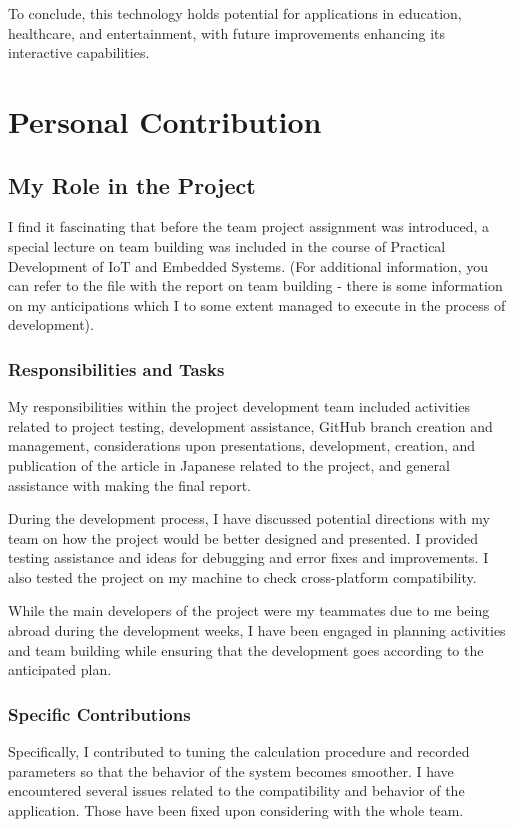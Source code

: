 \documentclass[12pt,a4paper]{article}
\begin{document}
To conclude, this technology holds potential for applications in education, healthcare, and entertainment, with future improvements enhancing its interactive capabilities.

\section{Personal Contribution}
\subsection{My Role in the Project}

I find it fascinating that before the team project assignment was introduced, a special lecture on team building was included in the course of Practical Development of IoT and Embedded Systems. (For additional information, you can refer to the file with the report on team building - there is some information on my anticipations which I to some extent managed to execute in the process of development).

\subsubsection{Responsibilities and Tasks}
My responsibilities within the project development team included activities related to project testing, development assistance, GitHub branch creation and management, considerations upon presentations, development, creation, and publication of the article in Japanese related to the project, and general assistance with making the final report.

During the development process, I have discussed potential directions with my team on how the project would be better designed and presented. I provided testing assistance and ideas for debugging and error fixes and improvements. I also tested the project on my machine to check cross-platform compatibility.

While the main developers of the project were my teammates due to me being abroad during the development weeks, I have been engaged in planning activities and team building while ensuring that the development goes according to the anticipated plan.

\subsubsection{Specific Contributions}
Specifically, I contributed to tuning the calculation procedure and recorded parameters so that the behavior of the system becomes smoother. I have encountered several issues related to the compatibility and behavior of the application. Those have been fixed upon considering with the whole team.
\end{document}
